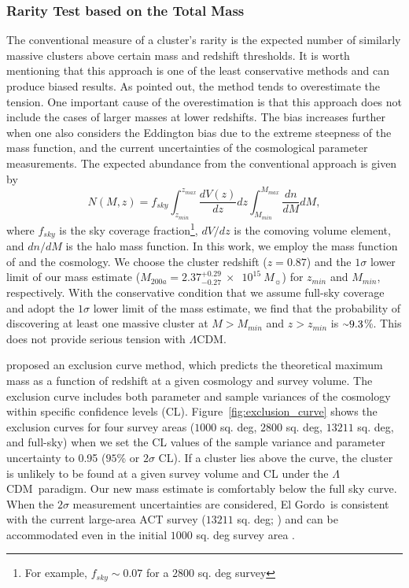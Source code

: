 \documentclass[twocolumn]{aastex631}
\newcommand{\elgordo}{El Gordo}
\newcommand{\LCDM}{$\Lambda$CDM}
\newcommand{\mytilde}{\raise.19ex\hbox{$\scriptstyle\sim$}}
\newcommand{\solarmA}{$10^{15}~M_{\sun}$}
\begin{document}
\subsubsection{Rarity Test based on the Total Mass} \label{rarity_mass_only}
The conventional measure of a cluster's rarity is the expected number of similarly massive clusters above certain mass and redshift thresholds. 
It is worth mentioning that this approach is one of the least conservative methods and can produce biased results. 
As \cite{Hotchkiss2011} pointed out, the method tends to overestimate the tension. One important cause of the overestimation is that this approach does not include the cases of larger masses at lower redshifts. 
The bias increases further when one also considers the Eddington bias \citep{Eddington1913} due to the extreme steepness of the mass function, and the current uncertainties of the cosmological parameter measurements. 
The expected abundance from the conventional approach is given by 
\begin{equation}
N(M,z) = f_{sky} \int_{z_{min}}^{z_{max}} \frac{dV(z)}{dz} dz \int_{M_{min}}^{M_{max}} \frac{dn}{dM} dM, 
\label{eqn_abundance}
\end{equation}
\noindent
where $f_{sky}$ is the sky coverage fraction\footnote{For example, $f_{sky}\sim0.07$ for a $2800$ sq. deg survey}, $dV/dz$ is the comoving volume element, and $dn/dM$ is the halo mass function. 
In this work, we employ the mass function of \cite{Tinker2008} and the \cite{Planck2016} cosmology. 
We choose the cluster redshift ($z=0.87$) and the $1\sigma$ lower limit of our mass estimate ($M_{200a} = 2.37^{+0.29}_{-0.27}~\times$~\solarmA) for $z_{min}$ and $M_{min}$, respectively. 
With the conservative condition that we assume full-sky coverage and adopt the $1\sigma$ lower limit of the mass estimate, we find that the probability of discovering at least one massive cluster at $M>M_{min}$ and $z>z_{min}$ is $\mytilde9.3$\%. This does not provide serious tension with \LCDM. 


\cite{Mortonson2011} proposed an exclusion curve method, which predicts the theoretical maximum mass as a function of redshift at a given cosmology and survey volume. 
The exclusion curve includes both parameter and sample variances of the cosmology within specific confidence levels (CL). 
Figure~\ref{fig:exclusion_curve} shows the exclusion curves for four survey areas ($1000$ sq. deg, $2800$ sq. deg, $13211$ sq. deg, and full-sky) when we set the CL values of the sample variance and parameter uncertainty to 0.95 ($95$\% or $2\sigma$ CL). 
If a cluster lies above the curve, the cluster is unlikely to be found at a given survey volume and CL under the \LCDM~paradigm. 
Our new mass estimate is comfortably below the full sky curve. 
When the $2\sigma$ measurement uncertainties are considered, \elgordo~is consistent with the current large-area ACT survey ($13211$ sq. deg; \citealt{Hilton2021}) and can be accommodated even in the initial $1000$ sq. deg survey area \citep{Hasselfield2013}. 
\end{document}
